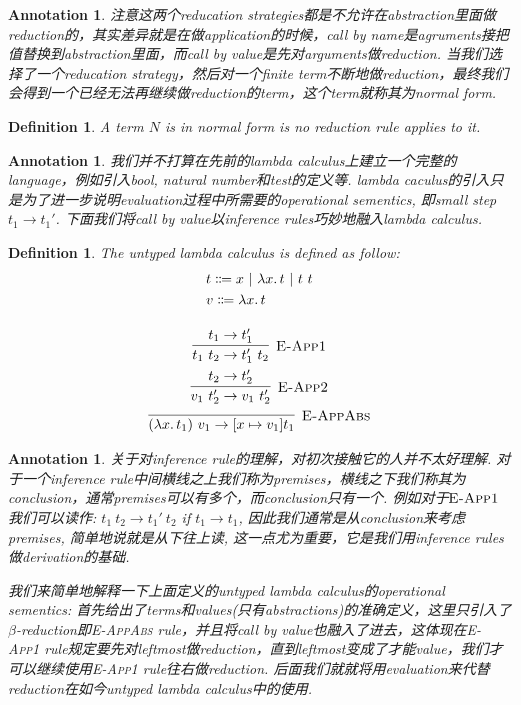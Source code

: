 \documentclass{article}
\newtheorem{definition}[theorem]{Definition}
\newtheorem{annotation}[theorem]{Annotation}
\newcommand{\lam}[2]{\ensuremath{\lambda #1\ldotp #2}} %
\begin{document}
\begin{annotation}
\rm 注意这两个reducation strategies都是不允许在abstraction里面做reduction的，其实差异就是在做application的时候，call by name是agruments接把值替换到abstraction里面，而call by value是先对arguments做reduction. 当我们选择了一个reducation strategy，然后对一个finite term不断地做reduction，最终我们会得到一个已经无法再继续做reduction的term，这个term就称其为\emph{normal form}.
\end{annotation}

\begin{definition}
\rm A term $N$ is in \emph{normal form} is no reduction rule applies to it.
\end{definition}

\begin{annotation}
\rm 我们并不打算在先前的lambda calculus上建立一个完整的language，例如引入bool, natural number和test的定义等. lambda caculus的引入只是为了进一步说明evaluation过程中所需要的\emph{operational sementics}, 即small step $t_1 \to t_1'$. 下面我们将\emph{call by value}以inference rules巧妙地融入lambda calculus.
\end{annotation}

\begin{definition}
\rm The untyped lambda calculus is defined as follow:
\[
	\begin{gathered}
	\begin{aligned}
	&t \Coloneqq x ~|~ \lam{x}{t} ~|~ t~t \\
	&v \Coloneqq \lam{x}{t}
	\end{aligned} \\[1em]
	\infer[\textsc{E-App1}]{t_1~t_2 \to t_1'~t_2}{t_1 \to t_1'} \\
	\infer[\textsc{E-App2}]{v_1~t_2' \to v_1~t_2'}{t_2 \to t_2'} \\
	\infer[\textsc{E-AppAbs}]{(\lam{x}{t_1})~v_1 \to [x \mapsto v_1] t_1}{}
	\end{gathered}
\]
\end{definition}

\begin{annotation}
\rm 关于对inference rule的理解，对初次接触它的人并不太好理解. 对于一个inference rule中间横线之上我们称为premises，横线之下我们称其为conclusion，通常premises可以有多个，而conclusion只有一个. 例如对于$\textsc{E-App1}$我们可以读作: $t_1~t_2 \to t_1'~t_2$ if $t_1 \to t_1$, 因此我们通常是从conclusion来考虑premises, 简单地说就是从下往上读, 这一点尤为重要，它是我们用inference rules做derivation的基础. 

我们来简单地解释一下上面定义的untyped lambda calculus的operational sementics: 首先给出了terms和values(只有abstractions)的准确定义，这里只引入了$\beta$-reduction即\textsc{E-AppAbs} rule，并且将\emph{call by value}也融入了进去，这体现在\textsc{E-App1} rule规定要先对leftmost做reduction，直到leftmost变成了才能value，我们才可以继续使用\textsc{E-App1} rule往右做reduction. 后面我们就就将用evaluation来代替reduction在如今untyped lambda calculus中的使用.
\end{annotation}
\end{document}
